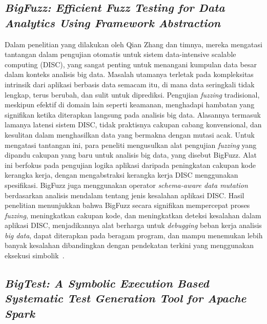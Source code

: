 \subsection{\emph{BigFuzz: Efficient Fuzz Testing for Data Analytics Using Framework Abstraction}}
\label{subsec:BigFuzz: Efficient Fuzz Testing for Data Analytics Using Framework Abstraction}

Dalam penelitian yang dilakukan oleh Qian Zhang dan timnya, mereka mengatasi tantangan dalam pengujian otomatis untuk sistem data-intensive scalable computing (DISC), yang sangat penting untuk menangani kumpulan data besar dalam konteks analisis big data. Masalah utamanya terletak pada kompleksitas intrinsik dari aplikasi berbasis data semacam itu, di mana data seringkali tidak lengkap, terus berubah, dan sulit untuk diprediksi. Pengujian \emph{fuzzing} tradisional, meskipun efektif di domain lain seperti keamanan, menghadapi hambatan yang signifikan ketika diterapkan langsung pada analisis big data. Alasannya termasuk lamanya latensi sistem DISC, tidak praktisnya cakupan cabang konvensional, dan kesulitan dalam menghasilkan data yang bermakna dengan mutasi acak. Untuk mengatasi tantangan ini, para peneliti mengusulkan alat pengujian \emph{fuzzing} yang dipandu cakupan yang baru untuk analisis big data, yang disebut BigFuzz. Alat ini berfokus pada pengujian logika aplikasi daripada peningkatan cakupan kode kerangka kerja, dengan mengabstraksi kerangka kerja DISC menggunakan spesifikasi. BigFuzz juga menggunakan operator \emph{schema-aware data mutation} berdasarkan analisis mendalam tentang jenis kesalahan aplikasi DISC. Hasil penelitian menunjukkan bahwa BigFuzz secara signifikan mempercepat proses \emph{fuzzing}, meningkatkan cakupan kode, dan meningkatkan deteksi kesalahan dalam aplikasi DISC, menjadikannya alat berharga untuk \emph{debugging} beban kerja analisis \emph{big data}, dapat diterapkan pada beragam program, dan mampu menemukan lebih banyak kesalahan dibandingkan dengan pendekatan terkini yang menggunakan eksekusi simbolik~\cite{zhang2021}.

\subsection{\emph{BigTest: A Symbolic Execution Based Systematic Test Generation Tool for Apache Spark}}
\label{subsec:BigTest: A Symbolic Execution Based Systematic Test Generation Tool for Apache Spark}

